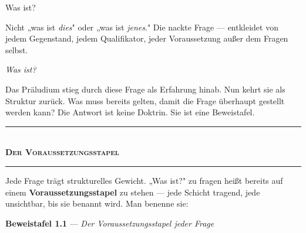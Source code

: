 \documentclass[10pt, openany, oneside]{book}
\renewcommand{\normalsize}{\fontsize{10}{13}\selectfont}
\begin{document}
\noindent Was ist?

Nicht „was ist \textit{dies}" oder „was ist \textit{jenes}." Die nackte Frage --- entkleidet von jedem Gegenstand, jedem Qualifikator, jeder Voraussetzung außer dem Fragen selbst.

\textit{Was ist?}

Das Präludium stieg durch diese Frage als Erfahrung hinab. Nun kehrt sie als Struktur zurück. Was muss bereits gelten, damit die Frage überhaupt gestellt werden kann? Die Antwort ist keine Doktrin. Sie ist eine Beweistafel.

\vspace{1.5em}


\begin{center}
    \rule{0.3\textwidth}{0.4pt}\\[0.5em]
    {\normalsize\bfseries\scshape Der Voraussetzungsstapel}\\[0.3em]
    \rule{0.3\textwidth}{0.4pt}
\end{center}

\vspace{1em}

Jede Frage trägt strukturelles Gewicht. „Was ist?" zu fragen heißt bereits auf einem \textbf{Voraussetzungsstapel} zu stehen --- jede Schicht tragend, jede unsichtbar, bis sie benannt wird. Man benenne sie:

\vspace{0.8em}

\textbf{Beweistafel 1.1} --- \textit{Der Voraussetzungsstapel jeder Frage}

\vspace{0.5em}
\end{document}
